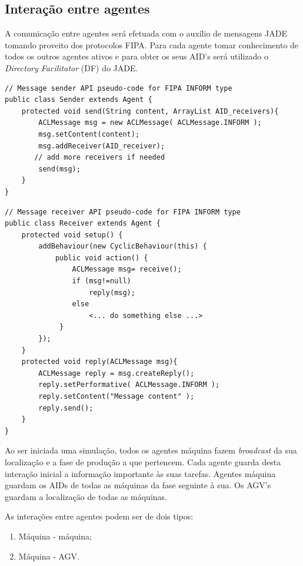 \begin{titlepage}
\newpage
\subsection{Interação entre agentes}
A comunicação entre agentes será efetuada com o auxílio de mensagens JADE tomando proveito dos protocolos FIPA. Para cada agente tomar conhecimento de todos os outros agentes ativos e para obter os seus AID's será utilizado o \textit{Directory Facilitator} (DF) do JADE.\newline

\begin{lstlisting}
// Message sender API pseudo-code for FIPA INFORM type
public class Sender extends Agent {
	protected void send(String content, ArrayList AID_receivers){
		ACLMessage msg = new ACLMessage( ACLMessage.INFORM );
		msg.setContent(content);
		msg.addReceiver(AID_receiver); 
       // add more receivers if needed
		send(msg);
    }
}
\end{lstlisting}

\begin{lstlisting}
// Message receiver API pseudo-code for FIPA INFORM type
public class Receiver extends Agent {
	protected void setup() {
    	addBehaviour(new CyclicBehaviour(this) {
        	public void action() {
            	ACLMessage msg= receive();
                if (msg!=null)
                	reply(msg);
                else
					<... do something else ...>
             }
		});
	}
    protected void reply(ACLMessage msg){
    	ACLMessage reply = msg.createReply();
        reply.setPerformative( ACLMessage.INFORM );
        reply.setContent("Message content" );
        reply.send();
    }
}
\end{lstlisting}

Ao ser iniciada uma simulação, todos os agentes máquina fazem \textit{broadcast} da sua localização e a fase de produção a que pertencem. Cada agente guarda desta interação inicial a informação importante às suas tarefas. Agentes máquina guardam os AIDs de todas as máquinas da fase seguinte à sua. Os AGV's guardam a localização de todas as máquinas.\newline

As interações entre agentes podem ser de dois tipos:

\begin{enumerate}
\item Máquina - máquina;
\item Máquina - AGV.
\end{enumerate}


\end{titlepage}
